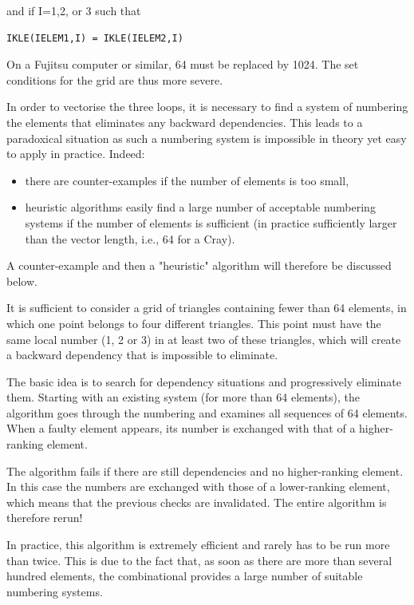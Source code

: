 and if I=1,2, or 3 such that

\begin{lstlisting}[language=TelFortran]
IKLE(IELEM1,I) = IKLE(IELEM2,I)
\end{lstlisting}

On a Fujitsu computer or similar, 64 must be replaced by 1024. The set
conditions for the grid are thus more severe.

In order to vectorise the three loops, it is necessary to find a system of
numbering the elements that eliminates any backward dependencies. This leads to
a paradoxical situation as such a numbering system is impossible in theory yet
easy to apply in practice. Indeed:
\begin{itemize}
  \item there are counter-examples if the number of elements is too small,
  \item heuristic algorithms easily find a large number of acceptable numbering
    systems if the number of elements is sufficient (in practice sufficiently
    larger than the vector length, i.e., 64 for a Cray).
\end{itemize}

A counter-example and then a "heuristic" algorithm will therefore be discussed
below.


It is sufficient to consider a grid of triangles containing fewer than 64
elements, in which one point belongs to four different triangles. This point
must have the same local number (1, 2 or 3) in at least two of these triangles,
which will create a backward dependency that is impossible to eliminate.


The basic idea is to search for dependency situations and progressively
eliminate them. Starting with an existing system (for more than 64 elements),
the algorithm goes through the numbering and examines all sequences of 64
elements. When a faulty element appears, its number is exchanged with that of a
higher-ranking element.

The algorithm fails if there are still dependencies and no higher-ranking
element. In this case the numbers are exchanged with those of a lower-ranking
element, which means that the previous checks are invalidated. The entire
algorithm is therefore rerun!

In practice, this algorithm is extremely efficient and rarely has to be run
more than twice. This is due to the fact that, as soon as there are more than
several hundred elements, the combinational provides a large number of suitable
numbering systems.

